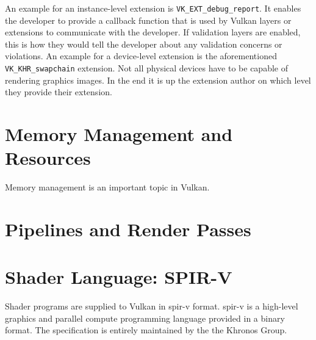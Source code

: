     An example for an instance-level extension is \lstinline{VK_EXT_debug_report}. It enables the developer to provide a callback function that is used by Vulkan layers or extensions to communicate with the developer. If validation layers are enabled, this is how they would tell the developer about any validation concerns or violations. An example for a device-level extension is the aforementioned \lstinline{VK_KHR_swapchain} extension. Not all physical devices have to be capable of rendering graphics images. In the end it is up the extension author on which level they provide their extension.

  \section{Memory Management and Resources}
  \label{sec:MemoryManagement}

    Memory management is an important topic in Vulkan.

    \tbd

  \section{Pipelines and Render Passes}
  \label{sec:RenderPasses}
    \tbd

  \section{Shader Language: SPIR-V}

    Shader programs are supplied to Vulkan in \acrfull{spir-v} format. \acrshort{spir-v} is a high-level graphics and parallel compute programming language provided in a binary format. The specification is entirely maintained by the the Khronos Group.

